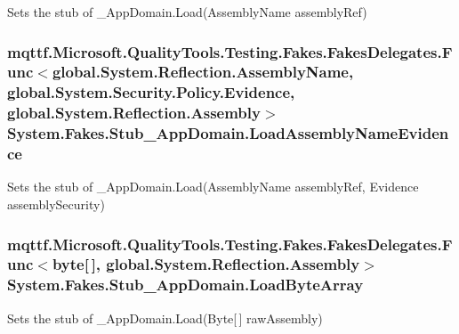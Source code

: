 Sets the stub of \-\_\-\-App\-Domain.\-Load(\-Assembly\-Name assembly\-Ref)

\hypertarget{class_system_1_1_fakes_1_1_stub___app_domain_a2540341ef26c1e2692afd68502f05a7b}{
\subsubsection[{Load\-Assembly\-Name\-Evidence}]{\setlength{\rightskip}{0pt plus 5cm}mqttf.\-Microsoft.\-Quality\-Tools.\-Testing.\-Fakes.\-Fakes\-Delegates.\-Func$<$global.\-System.\-Reflection.\-Assembly\-Name, global.\-System.\-Security.\-Policy.\-Evidence, global.\-System.\-Reflection.\-Assembly$>$ System.\-Fakes.\-Stub\-\_\-\-App\-Domain.\-Load\-Assembly\-Name\-Evidence}}\label{class_system_1_1_fakes_1_1_stub___app_domain_a2540341ef26c1e2692afd68502f05a7b}


Sets the stub of \-\_\-\-App\-Domain.\-Load(\-Assembly\-Name assembly\-Ref, Evidence assembly\-Security)

\hypertarget{class_system_1_1_fakes_1_1_stub___app_domain_a79b5e3e1543875482277bdd4ee0cba0b}{
\subsubsection[{Load\-Byte\-Array}]{\setlength{\rightskip}{0pt plus 5cm}mqttf.\-Microsoft.\-Quality\-Tools.\-Testing.\-Fakes.\-Fakes\-Delegates.\-Func$<$byte\mbox{[}$\,$\mbox{]}, global.\-System.\-Reflection.\-Assembly$>$ System.\-Fakes.\-Stub\-\_\-\-App\-Domain.\-Load\-Byte\-Array}}\label{class_system_1_1_fakes_1_1_stub___app_domain_a79b5e3e1543875482277bdd4ee0cba0b}


Sets the stub of \-\_\-\-App\-Domain.\-Load(\-Byte\mbox{[}$\,$\mbox{]} raw\-Assembly)

